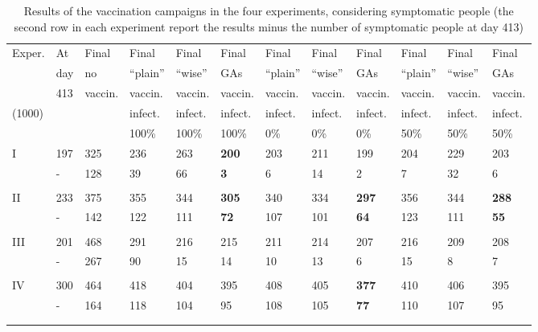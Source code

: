 \documentclass[graybox]{svmult}
\begin{document}
\begin{table}[t]
\centering
\begin{scriptsize} %
\begin{tabular}{llllllllllll}
\hline\noalign{\smallskip}
Exper.    & At   & Final      & Final        & Final       & Final      & Final       & Final    & Final        & Final    & Final        & Final     \\
             & day & no         & ``plain''       & ``wise''        & GAs         & ``plain''       & ``wise''        & GAs         & ``plain''       & ``wise''        & GAs    \\
             & 413 & vaccin. & vaccin.    & vaccin.  & vaccin.  & vaccin.  & vaccin.  & vaccin.  & vaccin.  & vaccin.  & vaccin.  \\
 (1000) &        &              &  infect.  &  infect. &  infect. &  infect. &  infect. &  infect. &  infect. &  infect. &  infect.\\
             &       &              &  100\%   &  100\% &  100\% &  0\% &  0\% &  0\% & 50\% &  50\% &  50\% \\
\noalign{\smallskip}\svhline\noalign{\smallskip}
I            & 197 & 325 & 236 & 263 & \textbf{200} & 203 & 211   & 199 & 204 & 229 & 203 \\
             & -      & 128 & 39    & 66  & \textbf{3}    &  6     & 14  & 2     & 7     & 32 & 6 \\
\\
II           & 233 & 375 & 355 &  344 & \textbf{305}  & 340 & 334 & \textbf{297}  & 356 & 344 &  \textbf{288} \\
             & -      &  142 & 122 & 111 & \textbf{72}    & 107 & 101 & \textbf{64}   & 123   & 111 &  \textbf{55} \\
\\
III           & 201 & 468 & 291 &  216 & 215  & 211 & 214 & 207  & 216 & 209 &  208 \\
             & -      &  267 & 90  & 15    & 14    & 10  & 13   &  6     & 15    & 8      &  7 \\
\\
IV           & 300 & 464 & 418 &  404 & 395  & 408 & 405 & \textbf{377}  & 410 & 406 &  395 \\
             & -      &  164 & 118  & 104    & 95  & 108 & 105 &  \textbf{77}  & 110    & 107  &  95 \\
\\
\hline\noalign{\smallskip}
\end{tabular}
\end{scriptsize}
\caption{Results of the vaccination campaigns in the four experiments, considering symptomatic people (the second row in each experiment report the results minus the number of symptomatic people at day 413)}
\label{caseSynopsys}
\end{table}
\end{document}
